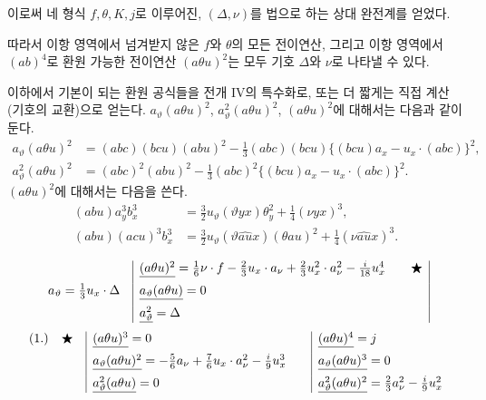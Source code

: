 이로써 네 형식 $f,\theta,K,j$로 이루어진, $(\Delta,\nu)$를 법으로 하는 상대 완전계를 얻었다.

따라서 이항 영역에서 넘겨받지 않은 $f$와 $\theta$의 모든 전이연산, 그리고 이항 영역에서 $(ab)^4$로 환원 가능한 전이연산 $(a\theta u)^2$는 모두 기호 $\Delta$와 $\nu$로 나타낼 수 있다.

이하에서 기본이 되는 환원 공식들을 전개 IV의 특수화로, 또는 더 짧게는 직접 계산(기호의 교환)으로 얻는다. $a_\vartheta(a\theta u)^2$, $a_\vartheta^2(a\theta u)^2$, $(a\theta u)^2$에 대해서는 다음과 같이 둔다.
\[
\begin{aligned}
a_\vartheta(a\theta u)^2
&=(abc)(bcu)(abu)^2-\frac13(abc)(bcu)\{(bcu)a_x-u_x\cdot(abc)\}^2,\\
a_\vartheta^2(a\theta u)^2
&=(abc)^2(abu)^2-\frac13(abc)^2\{(bcu)a_x-u_x\cdot(abc)\}^2.
\end{aligned}
\]
$(a\theta u)^2$에 대해서는 다음을 쓴다.
\[
\begin{aligned}
(abu)a_y^3b_x^3&=\frac32u_\vartheta(\vartheta yx)\theta_y^2+\frac14(\nu yx)^3,\\
(abu)(acu)^3b_x^3&=\frac32u_\vartheta(\vartheta\widehat{au}x)(\theta au)^2+\frac14(\nu\widehat{au}x)^3.
\end{aligned}
\]

\begingroup\small
\[
\begin{array}{r@{\quad}|l@{\qquad}c|}
& \underline{(a\theta u)^2}=\frac16\nu\cdot f-\frac23u_x\cdot a_\nu+\frac23u_x^2\cdot a_\nu^2-\frac{i}{18}u_x^4
& \bigstar\\[0.55em]
a_\vartheta=\frac13u_x\cdot\Delta
& \underline{a_\vartheta(a\theta u)}=0
& \\[0.55em]
& \underline{a_\vartheta^2}=\Delta
&
\end{array}
\]
\vspace{-0.5em}
\[
\begin{array}{r@{\quad}c@{\quad}|l@{\qquad}|l}
(1.) & \bigstar
& \underline{(a\theta u)^3}=0
& \underline{(a\theta u)^4}=j\\[0.55em]
&
& \underline{a_\vartheta(a\theta u)^2}=-\frac56a_\nu+\frac76u_x\cdot a_\nu^2-\frac{i}{9}u_x^3
& \underline{a_\vartheta(a\theta u)^3}=0\\[0.55em]
&
& \underline{a_\vartheta^2(a\theta u)}=0
& \underline{a_\vartheta^2(a\theta u)^2}=\frac23a_\nu^2-\frac{i}{9}u_x^2
\end{array}
\]
\endgroup

